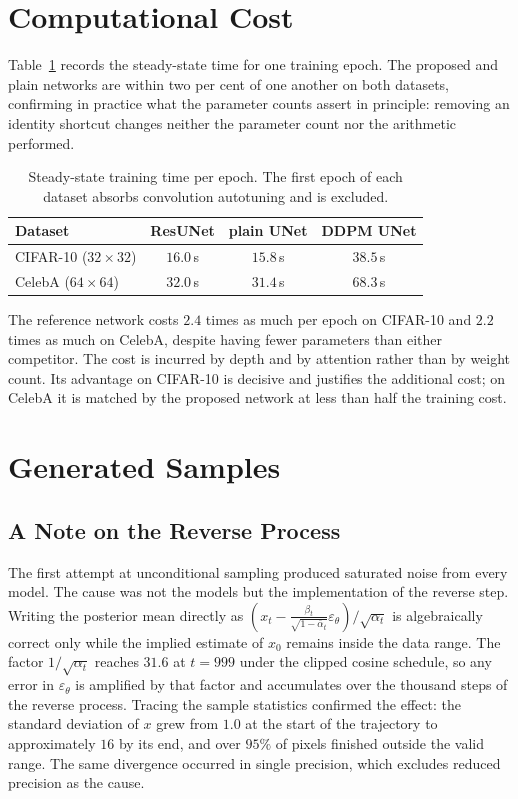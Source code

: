 \section{Computational Cost}

Table~\ref{tab:cost} records the steady-state time for one training epoch. The proposed and plain
networks are within two per cent of one another on both datasets, confirming in practice what the
parameter counts assert in principle: removing an identity shortcut changes neither the parameter
count nor the arithmetic performed.

\begin{table}[htbp]
    \centering
    \caption{Steady-state training time per epoch. The first epoch of each dataset absorbs
    convolution autotuning and is excluded.}
    \label{tab:cost}
    \begin{tabular}{lccc}
        \toprule
        Dataset & ResUNet & plain UNet & DDPM UNet \\
        \midrule
        CIFAR-10 ($32 \times 32$) & $16.0$\,s & $15.8$\,s & $38.5$\,s \\
        CelebA ($64 \times 64$)   & $32.0$\,s & $31.4$\,s & $68.3$\,s \\
        \bottomrule
    \end{tabular}
\end{table}

The reference network costs $2.4$ times as much per epoch on CIFAR-10 and $2.2$ times as much on
CelebA, despite having fewer parameters than either competitor. The cost is incurred by depth and by
attention rather than by weight count. Its advantage on CIFAR-10 is decisive and justifies the
additional cost; on CelebA it is matched by the proposed network at less than half the training
cost.

\section{Generated Samples}

\subsection{A Note on the Reverse Process}
\label{sec:reverse-note}

The first attempt at unconditional sampling produced saturated noise from every model. The cause was
not the models but the implementation of the reverse step. Writing the posterior mean directly as
$\left(x_t - \frac{\beta_t}{\sqrt{1-\bar\alpha_t}}\varepsilon_\theta\right)/\sqrt{\alpha_t}$ is
algebraically correct only while the implied estimate of $x_0$ remains inside the data range. The
factor $1/\sqrt{\alpha_t}$ reaches $31.6$ at $t = 999$ under the clipped cosine schedule, so any
error in $\varepsilon_\theta$ is amplified by that factor and accumulates over the thousand steps of
the reverse process. Tracing the sample statistics confirmed the effect: the standard deviation of
$x$ grew from $1.0$ at the start of the trajectory to approximately $16$ by its end, and over $95\%$
of pixels finished outside the valid range. The same divergence occurred in single precision, which
excludes reduced precision as the cause.

